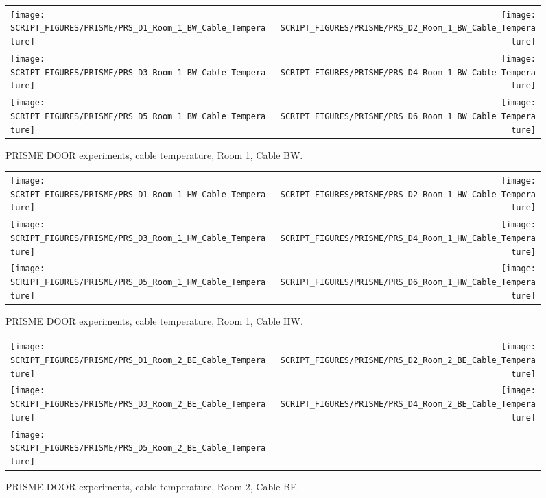 \begin{figure}[p]
\begin{tabular*}{\textwidth}{l@{\extracolsep{\fill}}r}
\texttt{[image: SCRIPT\_FIGURES/PRISME/PRS\_D1\_Room\_1\_BW\_Cable\_Temperature]} &
\texttt{[image: SCRIPT\_FIGURES/PRISME/PRS\_D2\_Room\_1\_BW\_Cable\_Temperature]} \\
\texttt{[image: SCRIPT\_FIGURES/PRISME/PRS\_D3\_Room\_1\_BW\_Cable\_Temperature]} &
\texttt{[image: SCRIPT\_FIGURES/PRISME/PRS\_D4\_Room\_1\_BW\_Cable\_Temperature]} \\
\texttt{[image: SCRIPT\_FIGURES/PRISME/PRS\_D5\_Room\_1\_BW\_Cable\_Temperature]} &
\texttt{[image: SCRIPT\_FIGURES/PRISME/PRS\_D6\_Room\_1\_BW\_Cable\_Temperature]}
\end{tabular*}
\caption{PRISME DOOR experiments, cable temperature, Room 1, Cable BW.}
\label{PRISME_BW_Cable_Room_1}
\end{figure}

\begin{figure}[p]
\begin{tabular*}{\textwidth}{l@{\extracolsep{\fill}}r}
\texttt{[image: SCRIPT\_FIGURES/PRISME/PRS\_D1\_Room\_1\_HW\_Cable\_Temperature]} &
\texttt{[image: SCRIPT\_FIGURES/PRISME/PRS\_D2\_Room\_1\_HW\_Cable\_Temperature]} \\
\texttt{[image: SCRIPT\_FIGURES/PRISME/PRS\_D3\_Room\_1\_HW\_Cable\_Temperature]} &
\texttt{[image: SCRIPT\_FIGURES/PRISME/PRS\_D4\_Room\_1\_HW\_Cable\_Temperature]} \\
\texttt{[image: SCRIPT\_FIGURES/PRISME/PRS\_D5\_Room\_1\_HW\_Cable\_Temperature]} &
\texttt{[image: SCRIPT\_FIGURES/PRISME/PRS\_D6\_Room\_1\_HW\_Cable\_Temperature]}
\end{tabular*}
\caption{PRISME DOOR experiments, cable temperature, Room 1, Cable HW.}
\label{PRISME_HW_Cable_Room_1}
\end{figure}

\begin{figure}[p]
\begin{tabular*}{\textwidth}{l@{\extracolsep{\fill}}r}
\texttt{[image: SCRIPT\_FIGURES/PRISME/PRS\_D1\_Room\_2\_BE\_Cable\_Temperature]} &
\texttt{[image: SCRIPT\_FIGURES/PRISME/PRS\_D2\_Room\_2\_BE\_Cable\_Temperature]} \\
\texttt{[image: SCRIPT\_FIGURES/PRISME/PRS\_D3\_Room\_2\_BE\_Cable\_Temperature]} &
\texttt{[image: SCRIPT\_FIGURES/PRISME/PRS\_D4\_Room\_2\_BE\_Cable\_Temperature]} \\
\texttt{[image: SCRIPT\_FIGURES/PRISME/PRS\_D5\_Room\_2\_BE\_Cable\_Temperature]} &
\end{tabular*}
\caption{PRISME DOOR experiments, cable temperature, Room 2, Cable BE.}
\label{PRISME_BE_Cable_Room_2}
\end{figure}

